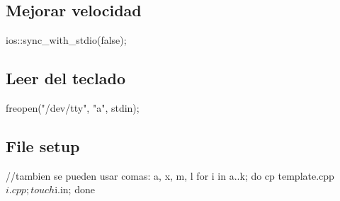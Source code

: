 \documentclass[10pt,landscape,twocolumn,a4paper,notitlepage]{article}
\begin{document}
\subsection*{Mejorar velocidad}
\begin{code}
ios::sync_with_stdio(false);
\end{code}
\subsection*{Leer del teclado}
\begin{code}
freopen("/dev/tty", "a", stdin);
\end{code}
\subsection*{File setup}
\begin{code}
//tambien se pueden usar comas: {a, x, m, l}
for i in {a..k}; do cp template.cpp $i.cpp; touch $i.in; done
\end{code}
\end{document}

